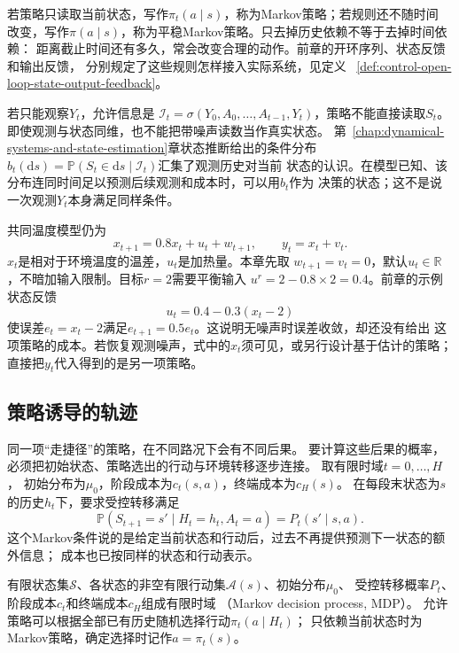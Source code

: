 若策略只读取当前状态，写作$\pi_t(a\mid s)$，称为Markov策略；若规则还不随时间
改变，写作$\pi(a\mid s)$，称为平稳Markov策略。只去掉历史依赖不等于去掉时间依赖：
距离截止时间还有多久，常会改变合理的动作。前章的开环序列、状态反馈和输出反馈，
分别规定了这些规则怎样接入实际系统，见定义
~\ref{def:control-open-loop-state-output-feedback}。

若只能观察$Y_t$，允许信息是
$\mathcal I_t=\sigma(Y_0,A_0,\ldots,A_{t-1},Y_t)$，策略不能直接读取$S_t$。
即使观测与状态同维，也不能把带噪声读数当作真实状态。
第~\ref{chap:dynamical-systems-and-state-estimation}章状态推断给出的条件分布
$b_t(\mathrm ds)=\mathbb P(S_t\in\mathrm ds\mid\mathcal I_t)$汇集了观测历史对当前
状态的认识。在模型已知、该分布连同时间足以预测后续观测和成本时，可以用$b_t$作为
决策的状态；这不是说一次观测$Y_t$本身满足同样条件。

共同温度模型仍为
\begin{equation}
  x_{t+1}=0.8x_t+u_t+w_{t+1},
  \qquad y_t=x_t+v_t.
  \label{eq:policy-temperature-model}
\end{equation}
$x_t$是相对于环境温度的温差，$u_t$是加热量。本章先取
$w_{t+1}=v_t=0$，默认$u_t\in\mathbb R$，不暗加输入限制。目标$r=2$需要平衡输入
$u^r=2-0.8\times2=0.4$。前章的示例状态反馈
\begin{equation}
  u_t=0.4-0.3(x_t-2)
  \label{eq:policy-temperature-feedback}
\end{equation}
使误差$e_t=x_t-2$满足$e_{t+1}=0.5e_t$。这说明无噪声时误差收敛，却还没有给出
这项策略的成本。若恢复观测噪声，式中的$x_t$须可见，或另行设计基于估计的策略；
直接把$y_t$代入得到的是另一项策略。

\subsection{策略诱导的轨迹}
\label{sec:policy-induced-trajectories}

同一项“走捷径”的策略，在不同路况下会有不同后果。
要计算这些后果的概率，必须把初始状态、策略选出的行动与环境转移逐步连接。
取有限时域$t=0,\ldots,H$，
初始分布为$\mu_0$，阶段成本为$c_t(s,a)$，终端成本为$c_H(s)$。
在每段末状态为$s$的历史$h_t$下，要求受控转移满足
\[
  \mathbb P(S_{t+1}=s'\mid H_t=h_t,A_t=a)=P_t(s'\mid s,a).
\]
这个Markov条件说的是给定当前状态和行动后，过去不再提供预测下一状态的额外信息；
成本也已按同样的状态和行动表示。

\begin{definition}[有限Markov决策过程与策略]
\label{def:decision-finite-mdp-policy}
有限状态集$\mathcal S$、各状态的非空有限行动集$\mathcal A(s)$、初始分布$\mu_0$、
受控转移概率$P_t$、阶段成本$c_t$和终端成本$c_H$组成有限时域
（Markov decision process, MDP）。
允许策略可以根据全部已有历史随机选择行动$\pi_t(a\mid H_t)$；
只依赖当前状态时为Markov策略，确定选择时记作$a=\pi_t(s)$。
\end{definition}

